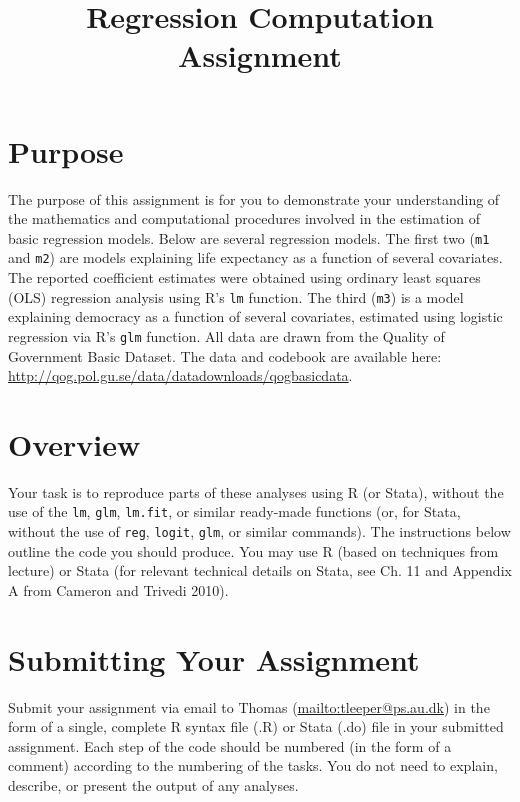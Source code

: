 \documentclass[a4paper,11pt]{article}
\title{Regression Computation Assignment}
\author{}
\date{}
\begin{document}
\maketitle

{\onehalfspacing

\section*{Purpose}

The purpose of this assignment is for you to demonstrate your understanding of the mathematics and computational procedures involved in the estimation of basic regression models. Below are several regression models. The first two (\texttt{m1} and \texttt{m2}) are models explaining life expectancy as a function of several covariates. The reported coefficient estimates were obtained using ordinary least squares (OLS) regression analysis using R's \texttt{lm} function. The third (\texttt{m3}) is a model explaining democracy as a function of several covariates, estimated using logistic regression via R's \texttt{glm} function. All data are drawn from the Quality of Government Basic Dataset. The data and codebook are available here: \url{http://qog.pol.gu.se/data/datadownloads/qogbasicdata}.

\section*{Overview}

Your task is to reproduce parts of these analyses using R (or Stata), without the use of the \texttt{lm}, \texttt{glm}, \texttt{lm.fit}, or similar ready-made functions (or, for Stata, without the use of \texttt{reg}, \texttt{logit}, \texttt{glm}, or similar commands). The instructions below outline the code you should produce. You may use R (based on techniques from lecture) or Stata (for relevant technical details on Stata, see Ch. 11 and Appendix A from Cameron and Trivedi 2010).
}

\section*{Submitting Your Assignment}

\noindent Submit your assignment via email to Thomas (\url{mailto:tleeper@ps.au.dk}) in the form of a single, complete R syntax file (.R) or Stata (.do) file in your submitted assignment. Each step of the code should be numbered (in the form of a comment) according to the numbering of the tasks. You do not need to explain, describe, or present the output of any analyses.
\end{document}
